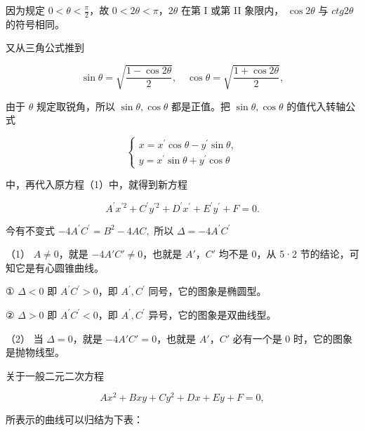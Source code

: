 因为规定 \(0 < \theta < \frac{\pi}{2}\)，故
\(0 < 2\theta < \pi\)，\(2\theta\) 在第 I 或第 II 象限内，
\(\cos2\theta\) 与 \(ctg2\theta\) 的符号相同。

又从三角公式推到

\[
\sin \theta = \sqrt {\frac {1 - \cos 2 \theta}{2}}, \quad \cos \theta = \sqrt {\frac {1 + \cos 2 \theta}{2}},
\]

由于 \(\theta\) 规定取锐角，所以 \(\sin \theta, \cos \theta\)
都是正值。把 \(\sin \theta, \cos \theta\) 的值代入转轴公式

\[
\left\{ \begin{array}{l} x = x^{\prime} \cos \theta - y^{\prime} \sin \theta, \\ y = x^{\prime} \sin \theta + y^{\prime} \cos \theta \end{array} \right.
\]

中，再代入原方程（1）中，就得到新方程

\[
A^{\prime} x^{\prime 2} + C^{\prime} y^{\prime 2} + D^{\prime} x^{\prime} + E^{\prime} y^{\prime} + F = 0.
\]

今有不变式 \(-4A^{\prime}C^{\prime}=B^{2}-4AC,\) 所以
\(\Delta = -4A^{\prime}C^{\prime}\)

（1） \(A \neq 0\)，就是 \(-4A'C' \neq 0\)，也就是 \(A'\)，\(C'\) 均不是
0，从 5·2 节的结论，可知它是有心圆锥曲线。

① \(\Delta<0\) 即 \(A^{\prime}C^{\prime}>0\)，即
\(A^{\prime}, C^{\prime}\) 同号，它的图象是椭圆型。

② \(\Delta>0\) 即 \(A^{\prime}C^{\prime}<0\)，即
\(A^{\prime}, C^{\prime}\) 异号，它的图象是双曲线型。

（2） 当 \(\Delta = 0\)，就是 \(-4A'C' = 0\)，也就是 \(A'\)，\(C'\)
必有一个是 0 时，它的图象是抛物线型。

关于一般二元二次方程

\[
A x^{2} + B x y + C y^{2} + D x + E y + F = 0,
\]

所表示的曲线可以归结为下表：

